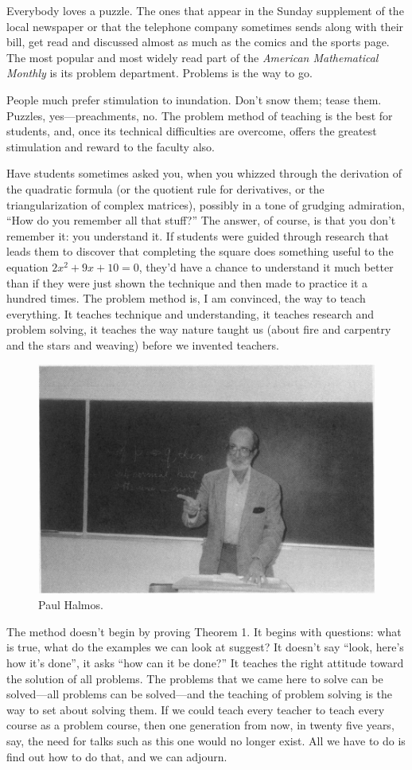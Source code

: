 \documentclass[a4paper,12pt]{article}
\begin{document}
Everybody loves a puzzle.  The ones that appear in the Sunday supplement
of the local newspaper or that the telephone company sometimes sends along
with their bill, get read and discussed almost as much as the comics and
the sports page.  The most popular and most widely read part of the
\emph{American Mathematical Monthly} is its problem department.  Problems is the
way to go.

People much prefer stimulation to inundation.  Don’t snow them; tease them.
Puzzles, yes—preachments, no.  The problem method of teaching is the best
for students, and, once its technical difficulties are overcome, offers the
greatest stimulation and reward to the faculty also.

Have students sometimes asked you, when you whizzed through the derivation
of the quadratic formula (or the quotient rule for derivatives, or the
triangularization of complex matrices), possibly in a tone of grudging
admiration, “How do you remember all that stuff?”  The answer, of course,
is that you don’t remember it: you understand it.  If students were guided
through research that leads them to discover that completing the square
does something useful to the equation \(2x^2 + 9x + 10 = 0\), they’d have
a chance to understand it much better than if they were just shown the
technique and then made to practice it a hundred times.  The problem
method is, I am convinced, the way to teach everything.  It teaches
technique and understanding, it teaches research and problem solving, it
teaches the way nature taught us (about fire and carpentry and the stars
and weaving) before we invented teachers.

\begin{figure}[htbp]
\centering
\includegraphics[width=.6\linewidth]{Halmos-Teaching.png}
\caption*{\label{fig:halmos-teaching}Paul Halmos.}
\end{figure}

The method doesn’t begin by proving Theorem 1.  It begins with questions:
what is true, what do the examples we can look at suggest?  It doesn’t say
“look, here’s how it’s done”, it asks “how can it be done?”  It teaches
the right attitude toward the solution of all problems.  The problems that
we came here to solve can be solved—all problems can be solved—and the
teaching of problem solving is the way to set about solving them.  If we
could teach every teacher to teach every course as a problem course, then
one generation from now, in twenty five years, say, the need for talks
such as this one would no longer exist.  All we have to do is find out how
to do that, and we can adjourn.
\end{document}
